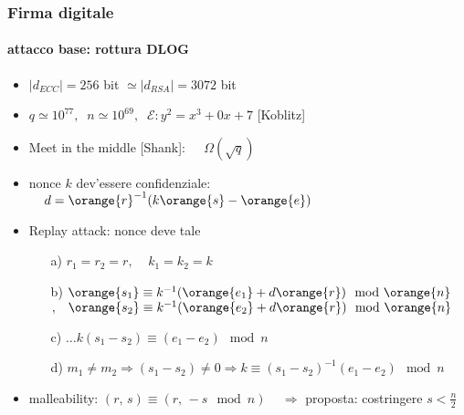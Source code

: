 \begin{frame}
	\frametitle{Firma digitale}
	\framesubtitle{attacco base: rottura DLOG}


	\begin{itemize}
		\item $|d_{ECC}|=256$ bit $\simeq |d_{RSA}|=3072 $ bit
		\item $q\simeq 10^{77},\;\;n\simeq 10^{69},\;\;\mathcal{E}:y^2=x^3+0x+7$ [Koblitz]
	\end{itemize}
	
	\begin{itemize}
	  	\item {\color{blue} Meet in the middle} [Shank]: $\;\;\;\;\Omega(\sqrt{q})$
		\item nonce $k$ dev'essere confidenziale: $\;\;\;\;d=\orange{r}^{-1}(k\orange{s}-\orange{e})$
		\item {\color{blue} Replay attack:} nonce deve tale
		\begin{enumerate}%
		  	\item[a)] $r_1=r_2=r,\;\;\;\; k_1=k_2=k$
			\item[b)] $\orange{s_1}\equiv k^{-1}(\orange{e_1}+d\orange{r})\mod \orange{n}$ 
					  $,\;\;\; \orange{s_2}\equiv k^{-1}(\orange{e_2}+d\orange{r})\mod \orange{n}$
			\item[c)] $\ldots k(s_1-s_2)\equiv(e_1-e_2)\mod n$
			\item[d)] $m_1\neq m_2 \Rightarrow (s_1-s_2)\neq 0\Rightarrow
			k\equiv(s_1-s_2)^{-1}(e_1-e_2)\mod n$
		\end{enumerate}
		\item {\color{blue} malleability:} $(r,\,s)\equiv(r,\,-s\mod n)$
		\newline $\;\;\;\Rightarrow$ proposta: costringere $s<\frac{n}{2}$
	\end{itemize} 

\end{frame}
